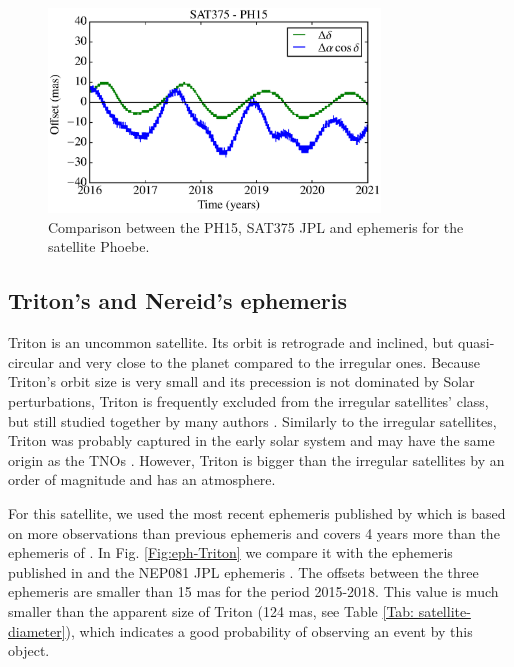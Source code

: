 \documentclass[useAMS,usenatbib]{mn2e}
\begin{document}
\begin{figure}
\begin{centering}
\includegraphics[width=8.8cm]{figures/Phoebe.eps} 
\caption{Comparison between the PH15, SAT375 JPL and \protect\cite{Emelyanov2007} ephemeris for the satellite Phoebe.}
\label{Fig:eph-Phoebe}
\end{centering}
\end{figure}

\subsection{Triton's and Nereid's ephemeris}

Triton is an uncommon satellite. Its orbit is retrograde and inclined, but quasi-circular and very close to the planet compared to the irregular ones. Because Triton's orbit size is very small and its precession is not dominated by Solar perturbations, Triton is frequently excluded from the irregular satellites' class, but still studied together by many authors \citep{Sheppard2005, Jewitt2007}. Similarly to the irregular satellites, Triton was probably captured in the early solar system and may have the same origin as the TNOs \citep{Agnor2006}. However, Triton is bigger than the irregular satellites by an order of magnitude and has an atmosphere.

For this satellite, we used the most recent ephemeris published by \cite{Emelyanov2015} which is based on more observations than previous ephemeris and covers 4 years more than the ephemeris of \cite{Jacobson2009}. In Fig. \ref{Fig:eph-Triton} we compare it with the ephemeris published in \cite{Zhang2014} and the NEP081 JPL ephemeris \citep{Jacobson2009}. The offsets between the three ephemeris are smaller than 15 mas for the period 2015-2018. This value is much smaller than the apparent size of Triton (124 mas, see Table \ref{Tab: satellite-diameter}), which indicates a good probability of observing an event by this object.
\end{document}
